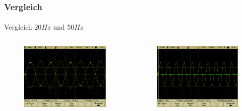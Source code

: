 \begin{frame}
\frametitle{Vergleich}
\framesubtitle{}
\begin{block}{}
    Vergleich $20Hz$ und $50Hz$
\end{block}
\begin{columns}[c]
        \begin{figure}[H]
        \begin{center}
                \includegraphics[scale=0.15]{./img/oszi/scope_5.png}
        \end{center}
        \end{figure}
        \begin{figure}[H]
        \begin{center}
                \includegraphics[scale=0.15]{./img/oszi/scope_7.png}
        \end{center}
        \end{figure}
\end{columns}

\end{frame}
